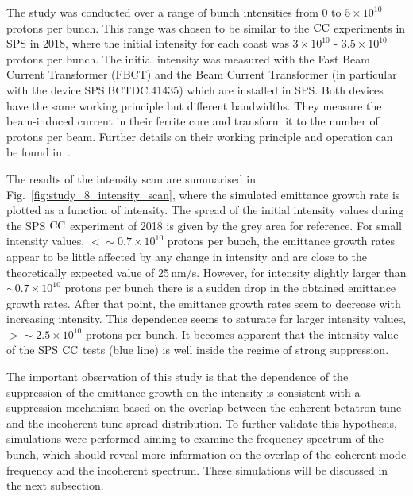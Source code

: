  The study was conducted over a range of bunch intensities from 0 to $5 \times 10^{10}$ protons per bunch. This range was chosen to be similar to the ${\mathrm{CC}}$ experiments in SPS in 2018, where the initial intensity for each coast was $3 \times 10^{10}$ - $3.5 \times 10^{10}$ protons per bunch. The initial intensity was measured with the Fast Beam Current Transformer (FBCT) and the Beam Current Transformer (in particular with the device SPS.BCTDC.41435) which are installed in SPS. Both devices have the same working principle but different bandwidths. They measure the beam-induced current in their ferrite core and transform it to the number of protons per beam. Further details on their working principle and operation can be found in~\cite{Jones:1982418, Jakob:624188}.

 The results of the intensity scan are summarised in Fig.~\ref{fig:study_8_intensity_scan}, where the simulated emittance growth rate is plotted as a function of intensity. The spread of the initial intensity values during the SPS ${\mathrm{CC}}$ experiment of 2018 is given by the grey area for reference. For small intensity values, $< \sim 0.7\times 10^{10}$ protons per bunch, the emittance growth rates appear to be little affected by any change in intensity and are close to the theoretically expected value of 25\,nm/s. However, for intensity slightly larger than $\sim 0.7 \times 10^{10}$ protons per bunch there is a sudden drop in the obtained emittance growth rates. After that point, the emittance growth rates seem to decrease with increasing intensity. This dependence seems to saturate for larger intensity values, $>\sim 2.5 \times 10^{10}$ protons per bunch. It becomes apparent that the intensity value of the SPS ${\mathrm{CC}}$ tests (blue line) is well inside the regime of strong suppression.

The important observation of this study is that the dependence of the suppression of the emittance growth on the intensity is consistent with a suppression mechanism based on the overlap between the coherent betatron tune and the incoherent tune spread distribution. To further validate this hypothesis, simulations were performed aiming to examine the frequency spectrum of the bunch, which should reveal more information on the overlap of the coherent mode frequency and the incoherent spectrum. These simulations will be discussed in the next subsection.


